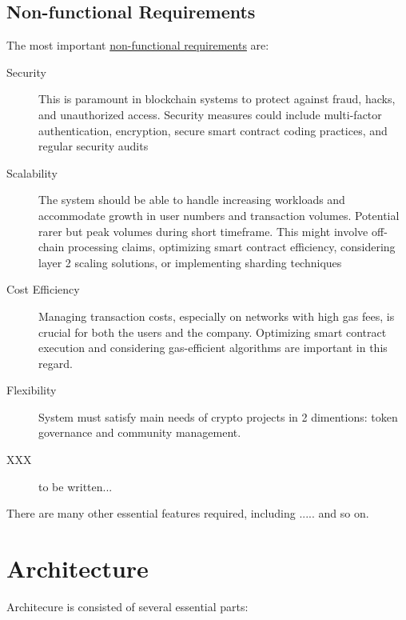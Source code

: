 \documentclass[12pt,oneside]{article}
\begin{document}
\subsection{Non-functional Requirements}
\label{sec:nfr}

The most important \href{https://en.wikipedia.org/wiki/Non-functional_requirement}{non-functional requirements} are:

\begin{description}
  \item[Security]
  This is paramount in blockchain systems to protect against fraud, hacks,
   and unauthorized access. Security measures could include multi-factor authentication, 
  encryption, secure smart contract coding practices, and regular security audits

  \item[Scalability]
  The system should be able to handle increasing workloads and 
  accommodate growth in user numbers and transaction volumes. Potential rarer but peak volumes during short timeframe.  
  This might involve off-chain processing claims, optimizing smart contract efficiency,
  considering layer 2 scaling solutions, or implementing sharding techniques

  \item[Cost Efficiency]
  Managing transaction costs, especially on networks with high gas fees, 
  is crucial for both the users and the company. 
  Optimizing smart contract execution and considering gas-efficient 
  algorithms are important in this regard.

  \item[Flexibility]
  System must satisfy main needs of crypto projects in 2 dimentions: 
  token governance and community management.

  \item[XXX]
  to be written...

\end{description}

There are many other essential features required, including
..... and so on.

\section{Architecture}

Architecure is consisted of several essential parts:
\end{document}
